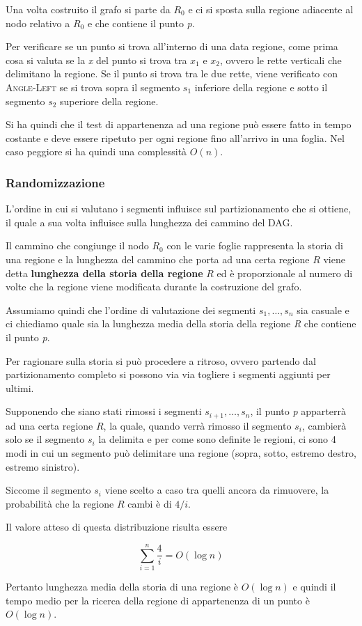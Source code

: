 Una volta costruito il grafo si parte da $R_0$ e ci si sposta sulla regione adiacente al nodo relativo a $R_0$ e che contiene il punto \emph{p}.

Per verificare se un punto si trova all'interno di una data regione, come prima cosa si valuta se la \emph{x} del punto si trova tra $x_1$ e $x_2$, ovvero le rette verticali che delimitano la regione. 
Se il punto si trova tra le due rette, viene verificato con \textsc{Angle-Left} se si trova sopra il segmento $s_1$ inferiore della regione e sotto il segmento $s_2$ superiore della regione.

Si ha quindi che il test di appartenenza ad una regione può essere fatto in tempo costante e deve essere ripetuto per ogni regione fino all'arrivo in una foglia. 
Nel caso peggiore si ha quindi una complessità $O(n)$.
\FloatBarrier
\subsubsection{Randomizzazione}\label{randomizzazione}

L'ordine in cui si valutano i segmenti influisce sul partizionamento che si ottiene, il quale a sua volta influisce sulla lunghezza dei cammino del DAG.

Il cammino che congiunge il nodo $R_0$ con le varie foglie rappresenta la storia di una regione e la lunghezza del cammino che porta ad una certa regione $R$ viene detta \textbf{lunghezza della storia della regione} $R$ ed è proporzionale al numero di volte che la regione viene modificata durante la costruzione del grafo.

Assumiamo quindi che l'ordine di valutazione dei segmenti $s_1, \ldots, s_n$ sia casuale e ci chiediamo quale sia la lunghezza media della storia della regione \emph{R} che contiene il punto \emph{p}.

Per ragionare sulla storia si può procedere a ritroso, ovvero partendo dal partizionamento completo si possono via via togliere i segmenti aggiunti per ultimi.

Supponendo che siano stati rimossi i segmenti $s_{i+1}, \ldots, s_n$, il punto \textit{p} apparterrà ad una certa regione $ R $, la quale, quando verrà rimosso il segmento $s_i$, cambierà solo se il segmento $ s_i $ la delimita e per come sono definite le regioni, ci sono 4 modi in cui un segmento può delimitare una regione (sopra, sotto, estremo destro, estremo sinistro).

Siccome il segmento $s_i$ viene scelto a caso tra quelli ancora da rimuovere, la probabilità che la regione $ R $ cambi è di $ 4/i $.

Il valore atteso di questa distribuzione risulta essere

$$
\sum\limits_{i=1}^{n} \frac{4}{i} = O(\log n)
$$

Pertanto lunghezza media della storia di una regione è $ O(\log n) $ e quindi il tempo medio per la ricerca della regione di appartenenza di un punto è $ O(\log n) $.